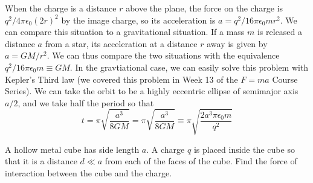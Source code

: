 \documentclass[11pt]{scrartcl}
\begin{document}
\begin{sol}
    When the charge is a distance $r$ above the plane, the force on the charge is $q^2/4\pi\epsilon_0(2r)^2$ by the image charge, so its acceleration is $a=q^2/16\pi\epsilon_0mr^2$. We can compare this situation to a gravitational situation. If a mass $m$ is released a distance $a$ from a star, its acceleration at a distance $r$ away is given by $a=GM/r^2$. We can thus compare the two situations with the equivalence $q^2/16\pi\epsilon_0m\equiv GM$. In the gravtiational case, we can easily solve this problem with Kepler's Third law (we covered this problem in Week 13 of the $F=ma$ Course Series). We can take the orbit to be a highly eccentric ellipse of semimajor axis $a/2$, and we take half the period so that $$t=\pi\sqrt{\frac{a^3}{8GM}}=\pi\sqrt{\frac{a^3}{8GM}}\equiv \boxed{\pi\sqrt{\frac{2a^3\pi\epsilon_0m}{q^2}}}$$
\end{sol}

\begin{prob}
    A hollow metal cube has side length $a$. A charge $q$ is placed inside the cube so that it is a distance $d\ll a$ from each of the faces of the cube. Find the force of interaction between the cube and the charge.
\end{prob}
\end{document}
